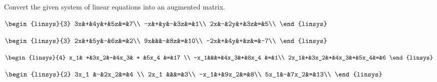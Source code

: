 

\begin{Exercise}[
name={},
title={}, 
difficulty=0,
origin={\cite{GH}}]
Convert the given system of linear equations into an augmented matrix.

\Question
$
\begin{linsys}{3}
3x&+&4y&+&5z&=&7\\
-x&+&y&-&3z&=&1\\
2x&-&2y&+&3z&=&5\\
\end{linsys}
$

\Question
$
\begin{linsys}{3}
2x&+&5y&-&6z&=&2\\
9x&&&-&8z&=&10\\
-2x&+&4y&+&z&=&-7\\
\end{linsys}
$

\Question
$
\begin{linsys}{4}
x_1& +&3x_2&-&4x_3& + &5x_4 &=&17 \\
-x_1&&&+&4x_3&+&8x_4 &=&1\\
2x_1&+&3x_2&+&4x_3&+&5x_4&=&6
\end{linsys}
$

\Question
$
\begin{linsys}{2}
3x_1 &-&2x_2&=&4 \\
2x_1 &&&=&3\\
-x_1&+&9x_2&=&8\\
5x_1&-&7x_2&=&13\\
\end{linsys}
$

\end{Exercise}

